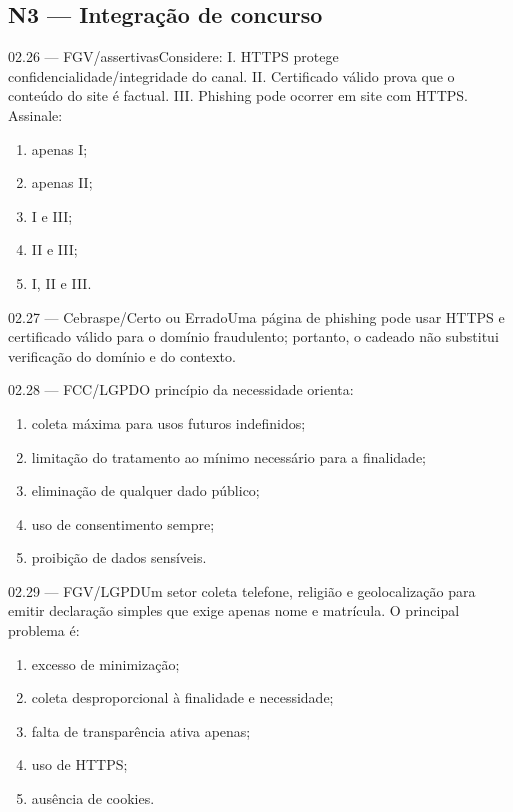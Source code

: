 \subsection*{N3 — Integração de concurso}
\begin{questao}{ 02.26 — FGV/assertivas}Considere: I. HTTPS protege confidencialidade/integridade do canal. II. Certificado válido prova que o conteúdo do site é factual. III. Phishing pode ocorrer em site com HTTPS. Assinale:\begin{enumerate}[label=\Alph*)]\item apenas I;\item apenas II;\item I e III;\item II e III;\item I, II e III.\end{enumerate}\end{questao}
\begin{questao}{ 02.27 — Cebraspe/Certo ou Errado}Uma página de phishing pode usar HTTPS e certificado válido para o domínio fraudulento; portanto, o cadeado não substitui verificação do domínio e do contexto.\end{questao}
\begin{questao}{ 02.28 — FCC/LGPD}O princípio da necessidade orienta:\begin{enumerate}[label=\Alph*)]\item coleta máxima para usos futuros indefinidos;\item limitação do tratamento ao mínimo necessário para a finalidade;\item eliminação de qualquer dado público;\item uso de consentimento sempre;\item proibição de dados sensíveis.\end{enumerate}\end{questao}
\begin{questao}{ 02.29 — FGV/LGPD}Um setor coleta telefone, religião e geolocalização para emitir declaração simples que exige apenas nome e matrícula. O principal problema é:\begin{enumerate}[label=\Alph*)]\item excesso de minimização;\item coleta desproporcional à finalidade e necessidade;\item falta de transparência ativa apenas;\item uso de HTTPS;\item ausência de cookies.\end{enumerate}\end{questao}
